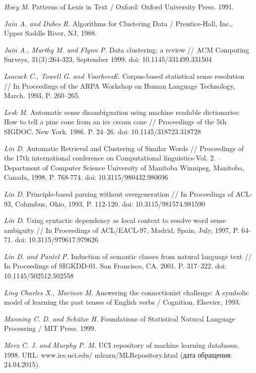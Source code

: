\documentclass{article}
\begin{document}
\begin{articletext}
\begin{thebibliography}{9}
\textit{Hoey M. }Patterns of Lexis in Text / Oxford: Oxford University Press. 1991. 

\textit{Jain A. and  Dubes R. }Algorithms for Clustering Data / Prentice-Hall, Inc., Upper Saddle River, NJ, 1988.

\textit{Jain A.,  Murthy M. and  Flynn P. }Data clustering: a review // ACM Computing Surveys, 31(3):264-323, September 1999. doi: 10.1145/331499.331504

\textit{Leacock C.,  Towell G. and  VoorheesE. }Corpus-based statistical sense resolution // In Proceedings of the ARPA Workshop on Human Language Technology, March. 1993, P. 260–265.  

\textit{Lesk M. }Automatic sense disambiguation using machine readable dictionaries: How to tell a pine cone from an ice cream cone //  Proceedings  of  the 5th SIGDOC. New York. 1986. P. 24–26. doi: 10.1145/318723.318728

\textit{Lin D. }Automatic Retrieval and Clustering of Similar Words // Proceedings of the 17th international conference on Computational linguistics-Vol. 2. –  Department of Computer Science University of Manitoba Winnipeg, Manitoba, Canada, 1998, P. 768-774. doi: 10.3115/980432.980696

\textit{Lin D. }Principle-based parsing without overgeneration // In Proceedings of ACL-93, Columbus, Ohio, 1993, P. 112-120. doi: 10.3115/981574.981590

\textit{Lin D. }Using syntactic dependency as local context to resolve word sense ambiguity // In Proceedings of ACL/EACL-97, Madrid, Spain, July, 1997, P. 64-71. doi: 10.3115/979617.979626


\textit{Lin D. and Pantel P. }Induction of semantic classes from natural language text // In Proceedings of SIGKDD-01. San Francisco, CA. 2001. P. 317–322. doi: 10.1145/502512.502558  

\textit{Ling Charles X.,  Marinov M. }Answering the connectionist challenge: A symbolic model of learning the past tenses of English verbs /  Cognition, Elsevier, 1993.


\textit{Manning C. D. and  Sch\"utze H. }Foundations of Statistical Natural Language Processing / MIT Press. 1999.

\textit{Merz C. J. and  Murphy P. M. }UCI repository of machine learning databases, 1998. URL: www.ics.uci.edu/ mlearn/MLRepository.html (дата обращения: 24.04.2015).


\end{thebibliography}
\end{articletext}
\end{document}
